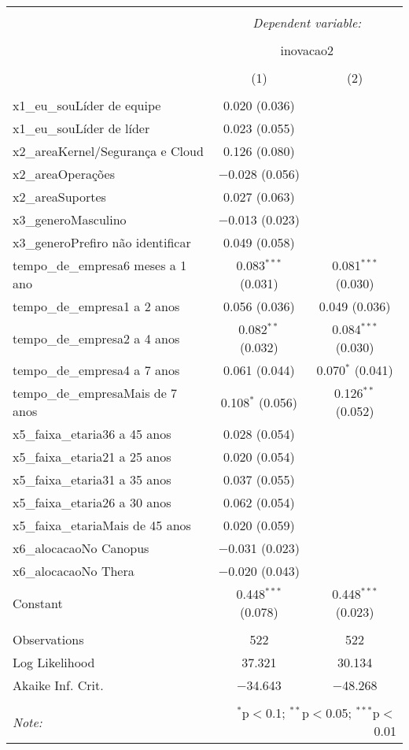\documentclass[]{book}
\begin{document}
\begin{table}[!htbp] \centering 
  \caption{} 
  \label{} 
\begin{tabular}{@{\extracolsep{5pt}}lcc} 
\\[-1.8ex]\hline 
\hline \\[-1.8ex] 
 & \multicolumn{2}{c}{\textit{Dependent variable:}} \\ 
\cline{2-3} 
\\[-1.8ex] & \multicolumn{2}{c}{inovacao2} \\ 
\\[-1.8ex] & (1) & (2)\\ 
\hline \\[-1.8ex] 
 x1\_eu\_souLíder de equipe & 0.020 (0.036) &  \\ 
  x1\_eu\_souLíder de líder & 0.023 (0.055) &  \\ 
  x2\_areaKernel/Segurança e Cloud & 0.126 (0.080) &  \\ 
  x2\_areaOperações & $-$0.028 (0.056) &  \\ 
  x2\_areaSuportes & 0.027 (0.063) &  \\ 
  x3\_generoMasculino & $-$0.013 (0.023) &  \\ 
  x3\_generoPrefiro não identificar & 0.049 (0.058) &  \\ 
  tempo\_de\_empresa6 meses a 1 ano & 0.083$^{***}$ (0.031) & 0.081$^{***}$ (0.030) \\ 
  tempo\_de\_empresa1 a 2 anos & 0.056 (0.036) & 0.049 (0.036) \\ 
  tempo\_de\_empresa2 a 4 anos & 0.082$^{**}$ (0.032) & 0.084$^{***}$ (0.030) \\ 
  tempo\_de\_empresa4 a 7 anos & 0.061 (0.044) & 0.070$^{*}$ (0.041) \\ 
  tempo\_de\_empresaMais de 7 anos & 0.108$^{*}$ (0.056) & 0.126$^{**}$ (0.052) \\ 
  x5\_faixa\_etaria36 a 45 anos & 0.028 (0.054) &  \\ 
  x5\_faixa\_etaria21 a 25 anos & 0.020 (0.054) &  \\ 
  x5\_faixa\_etaria31 a 35 anos & 0.037 (0.055) &  \\ 
  x5\_faixa\_etaria26 a 30 anos & 0.062 (0.054) &  \\ 
  x5\_faixa\_etariaMais de 45 anos & 0.020 (0.059) &  \\ 
  x6\_alocacaoNo Canopus & $-$0.031 (0.023) &  \\ 
  x6\_alocacaoNo Thera & $-$0.020 (0.043) &  \\ 
  Constant & 0.448$^{***}$ (0.078) & 0.448$^{***}$ (0.023) \\ 
 \hline \\[-1.8ex] 
Observations & 522 & 522 \\ 
Log Likelihood & 37.321 & 30.134 \\ 
Akaike Inf. Crit. & $-$34.643 & $-$48.268 \\ 
\hline 
\hline \\[-1.8ex] 
\textit{Note:}  & \multicolumn{2}{r}{$^{*}$p$<$0.1; $^{**}$p$<$0.05; $^{***}$p$<$0.01} \\ 
\end{tabular} 
\end{table}
\end{document}
